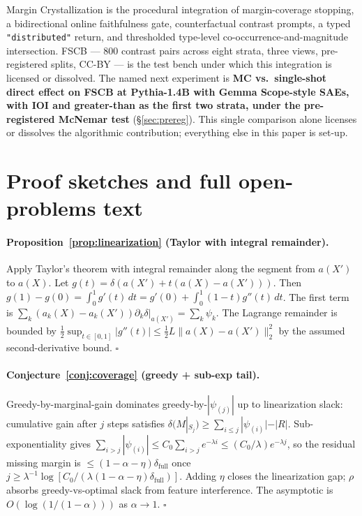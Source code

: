 \documentclass[10pt]{article}
\begin{document}
Margin Crystallization is the procedural integration of margin-coverage stopping, a bidirectional online faithfulness gate, counterfactual contrast prompts, a typed \texttt{"distributed"} return, and thresholded type-level co-occurrence-and-magnitude intersection. FSCB --- 800 contrast pairs across eight strata, three views, pre-registered splits, CC-BY --- is the test bench under which this integration is licensed or dissolved. The named next experiment is \textbf{MC vs.\ single-shot direct effect on FSCB at Pythia-1.4B with Gemma Scope-style SAEs, with IOI and greater-than as the first two strata, under the pre-registered McNemar test} (\S\ref{sec:prereg}). This single comparison alone licenses or dissolves the algorithmic contribution; everything else in this paper is set-up.




\appendix

\section{Proof sketches and full open-problems text}
\label{app:proofs}

\paragraph{Proposition~\ref{prop:linearization} (Taylor with integral remainder).} Apply Taylor's theorem with integral remainder along the segment from $a(X')$ to $a(X)$. Let $g(t) = \delta(a(X') + t(a(X) - a(X')))$. Then $g(1) - g(0) = \int_0^1 g'(t)\, dt = g'(0) + \int_0^1 (1-t) g''(t)\, dt$. The first term is $\sum_k (a_k(X) - a_k(X')) \partial_k\delta|_{a(X')} = \sum_k \psi_k$. The Lagrange remainder is bounded by $\tfrac{1}{2}\sup_{t \in [0,1]} |g''(t)| \leq \tfrac{1}{2} L \|a(X) - a(X')\|_2^2$ by the assumed second-derivative bound. $\square$

\paragraph{Conjecture~\ref{conj:coverage} (greedy + sub-exp tail).} Greedy-by-marginal-gain dominates greedy-by-$|\psi_{(j)}|$ up to linearization slack: cumulative gain after $j$ steps satisfies $\delta(M|_{S_j}) \geq \sum_{i \leq j} |\psi_{(i)}| - |R|$. Sub-exponentiality gives $\sum_{i > j} |\psi_{(i)}| \leq C_0 \sum_{i > j} e^{-\lambda i} \leq (C_0/\lambda) e^{-\lambda j}$, so the residual missing margin is $\leq (1-\alpha-\eta)\delta_{\text{full}}$ once $j \geq \lambda^{-1} \log[C_0/(\lambda(1-\alpha-\eta)\delta_{\text{full}})]$. Adding $\eta$ closes the linearization gap; $\rho$ absorbs greedy-vs-optimal slack from feature interference. The asymptotic is $O(\log(1/(1-\alpha)))$ as $\alpha \to 1$. $\square$
\end{document}
